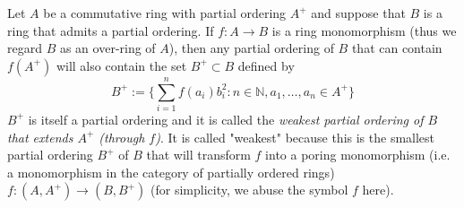 \documentclass[12pt]{article}
\theoremstyle{definition}
\theoremstyle{remark}
\newcommand{\N}{\mathbb{N}}
\begin{document}
Let $A$ be a commutative ring with partial ordering $A^+$ and suppose that $B$ is a ring that admits a partial ordering.  
If $f:A \rightarrow B$ is a ring monomorphism (thus we regard $B$ as an over-ring of $A$), 
then any partial ordering of $B$ that can contain $f(A^+)$ will also contain the set $B^+\subset B$ defined by 
$$B^+ :=\{\sum_{i=1}^n f(a_i)b_i^2  : n\in \N,a_1,\dots,a_n\in A^+\}$$
$B^+$ is itself a partial ordering and it is called the 
\emph{weakest partial ordering of $B$ that extends $A^+$ (through $f$)}. It is called "weakest" because this is the smallest partial ordering $B^+$ of $B$ that will transform $f$ into a poring monomorphism (i.e. a monomorphism in the category of partially ordered rings) $f:(A,A^+)\rightarrow (B,B^+)$ (for simplicity, we abuse the symbol $f$ here).
\end{document}

